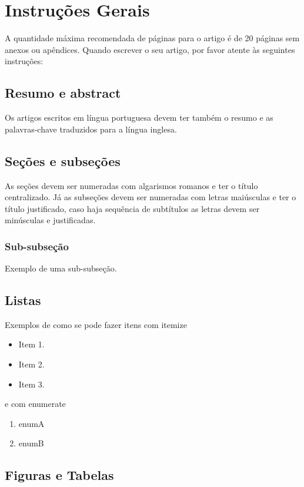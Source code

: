 \section{Instruções Gerais}

A quantidade máxima recomendada de páginas para o artigo é de 20 páginas sem anexos ou apêndices.
Quando escrever o seu artigo, por favor atente às seguintes instruções:

\subsection{Resumo e abstract}
Os artigos escritos em língua portuguesa devem ter também o resumo e as palavras-chave traduzidos para a língua inglesa.

\subsection{Seções e subseções}
As seções devem ser numeradas com algarismos romanos e ter o título centralizado. Já as subseções devem ser numeradas com letras maiúsculas e ter o título justificado, caso haja sequência de subtítulos as letras devem ser minúsculas e justificadas. 

\subsubsection{Sub-subseção}

Exemplo de uma sub-subseção.

\subsection{Listas}

Exemplos de como se pode fazer itens com itemize

\begin{itemize}
\item Item 1.
\item Item 2.
\item Item 3.
\end{itemize}

e com enumerate

\begin{enumerate}
 \item enumA
 \item enumB
\end{enumerate}

\subsection{Figuras e Tabelas}

